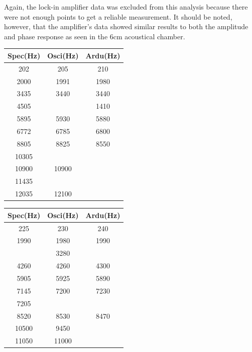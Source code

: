 \documentclass[12pt]{article}
\begin{document}
Again, the lock-in amplifier data was excluded from this analysis because there were not enough points to get a reliable measurement. It should be noted, however, that the amplifier's data showed similar results to both the amplitude and phase response as seen in the 6cm acoustical chamber. 

\begin{table}[!ht]
\centering
\begin{subtable}{0.45\textwidth}
\centering
{} \label{tab:six_ac} 
	\begin{tabular}{c|c|c}
	Spec(Hz)&Osci(Hz)&Ardu(Hz)\\
	\hline
	202       & 205      & 210      \\
	2000      & 1991     & 1980     \\
	3435      & 3440     & 3440     \\
	4505      &          & 1410     \\
	5895      & 5930     & 5880     \\
	6772      & 6785     & 6800     \\
	8805      & 8825     & 8550     \\
	10305     &          &          \\
	10900     & 10900    &          \\
	11435     &          &          \\
	12035     & 12100    &         
	\end{tabular}
	\bigskip
\end{subtable}
\begin{subtable}{0.45\textwidth}
\centering
{} \label{tab:five_ac} 
	\begin{tabular}{c|c|c}
	Spec(Hz)&Osci(Hz)&Ardu(Hz)\\
	\hline
	225        & 230       & 240       \\
	1990       & 1980      & 1990      \\
	           & 3280      &           \\
	4260       & 4260      & 4300      \\
	5905       & 5925      & 5890      \\
	7145       & 7200      & 7230      \\
	7205       &           &           \\
	8520       & 8530      & 8470      \\
	10500      & 9450      &           \\
	11050      & 11000     &           
	\end{tabular}
	\bigskip
\end{subtable}


\end{table}
\end{document}

